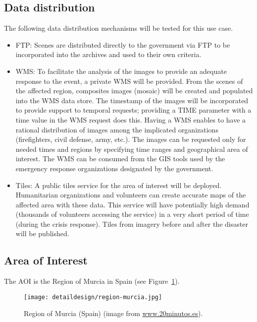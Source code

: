 \subsection{Data distribution}
The following data distribution mechanisms will be tested for this use case.
\begin{itemize}
\item \ac{FTP}: Scenes are distributed directly to the government via \ac{FTP} to be incorporated into the archives and used to their own criteria.
\item \ac{WMS}: To facilitate the analysis of the images to provide an adequate response to the event, a private \acl{WMS} will be provided. From the scenes of the affected region, composites images (mosaic) will be created and populated into the \ac{WMS} data store. The timestamp of the images will be incorporated to provide support to temporal requests; providing a TIME parameter with a time value in the WMS request does this. Having a WMS enables to have a rational distribution of images among the implicated organizations (firefighters, civil defense, army, etc.). The images can be requested only for needed times and regions by specifying time ranges and geographical area of interest. The WMS can be consumed from the GIS tools used by the emergency response organizations designated by the government.
\item Tiles: A public tiles service for the area of interest will be deployed. Humanitarian organizations and volunteers can create accurate maps of the affected area with these data. This service will have potentially high demand (thousands of volunteers accessing the service) in a very short period of time (during the crisis response). Tiles from imagery before and after the disaster will be published.
\end{itemize}

\subsection{Area of Interest} 
The \acl{AOI} is the Region of Murcia in Spain (see Figure~\ref{fig:region-murcia}). 

\begin{figure}[!h]
\begin{center}
\texttt{[image: detaildesign/region-murcia.jpg]}
\caption[Region of Murcia (Spain)]{Region of Murcia (Spain) (image from \url{www.20minutos.es}).}
\label{fig:region-murcia}
\end{center}
\end{figure}


